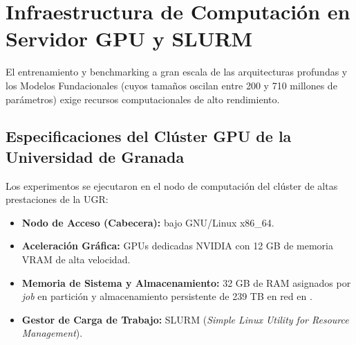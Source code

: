 \section{Infraestructura de Computación en Servidor GPU y SLURM}
\label{sec:exp_cluster}

El entrenamiento y benchmarking a gran escala de las arquitecturas profundas y los Modelos Fundacionales (cuyos tamaños oscilan entre 200 y 710 millones de parámetros) exige recursos computacionales de alto rendimiento.

\subsection{Especificaciones del Clúster GPU de la Universidad de Granada}
Los experimentos se ejecutaron en el nodo de computación  del clúster de altas prestaciones de la UGR:
\begin{itemize}
    \item \textbf{Nodo de Acceso (Cabecera):}  bajo GNU/Linux x86\_64.
    \item \textbf{Aceleración Gráfica:} GPUs dedicadas NVIDIA con 12 GB de memoria VRAM de alta velocidad.
    \item \textbf{Memoria de Sistema y Almacenamiento:} 32 GB de RAM asignados por \textit{job} en partición  y almacenamiento persistente de 239 TB en red en .
    \item \textbf{Gestor de Carga de Trabajo:} SLURM (\textit{Simple Linux Utility for Resource Management}).
\end{itemize}

